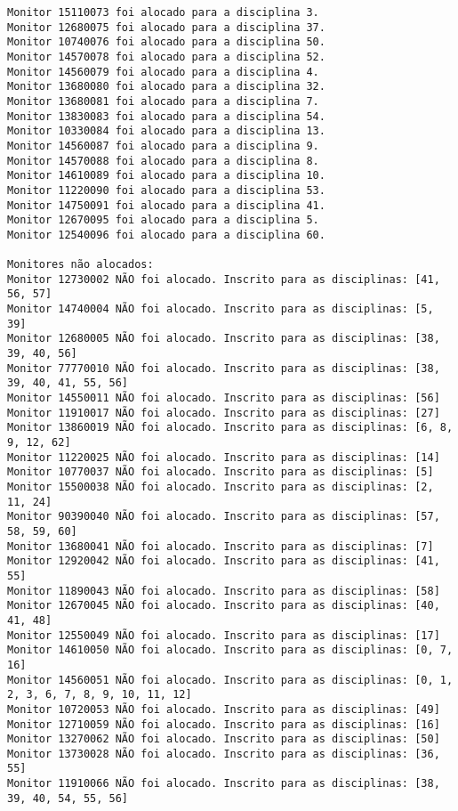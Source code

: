 \documentclass[a4paper,12pt]{article}
\begin{document}
\begin{lstlisting}[breaklines=true]
Monitor 15110073 foi alocado para a disciplina 3.
Monitor 12680075 foi alocado para a disciplina 37.
Monitor 10740076 foi alocado para a disciplina 50.
Monitor 14570078 foi alocado para a disciplina 52.
Monitor 14560079 foi alocado para a disciplina 4.
Monitor 13680080 foi alocado para a disciplina 32.
Monitor 13680081 foi alocado para a disciplina 7.
Monitor 13830083 foi alocado para a disciplina 54.
Monitor 10330084 foi alocado para a disciplina 13.
Monitor 14560087 foi alocado para a disciplina 9.
Monitor 14570088 foi alocado para a disciplina 8.
Monitor 14610089 foi alocado para a disciplina 10.
Monitor 11220090 foi alocado para a disciplina 53.
Monitor 14750091 foi alocado para a disciplina 41.
Monitor 12670095 foi alocado para a disciplina 5.
Monitor 12540096 foi alocado para a disciplina 60.

Monitores não alocados:
Monitor 12730002 NÃO foi alocado. Inscrito para as disciplinas: [41, 56, 57]
Monitor 14740004 NÃO foi alocado. Inscrito para as disciplinas: [5, 39]
Monitor 12680005 NÃO foi alocado. Inscrito para as disciplinas: [38, 39, 40, 56]
Monitor 77770010 NÃO foi alocado. Inscrito para as disciplinas: [38, 39, 40, 41, 55, 56]
Monitor 14550011 NÃO foi alocado. Inscrito para as disciplinas: [56]
Monitor 11910017 NÃO foi alocado. Inscrito para as disciplinas: [27]
Monitor 13860019 NÃO foi alocado. Inscrito para as disciplinas: [6, 8, 9, 12, 62]
Monitor 11220025 NÃO foi alocado. Inscrito para as disciplinas: [14]
Monitor 10770037 NÃO foi alocado. Inscrito para as disciplinas: [5]
Monitor 15500038 NÃO foi alocado. Inscrito para as disciplinas: [2, 11, 24]
Monitor 90390040 NÃO foi alocado. Inscrito para as disciplinas: [57, 58, 59, 60]
Monitor 13680041 NÃO foi alocado. Inscrito para as disciplinas: [7]
Monitor 12920042 NÃO foi alocado. Inscrito para as disciplinas: [41, 55]
Monitor 11890043 NÃO foi alocado. Inscrito para as disciplinas: [58]
Monitor 12670045 NÃO foi alocado. Inscrito para as disciplinas: [40, 41, 48]
Monitor 12550049 NÃO foi alocado. Inscrito para as disciplinas: [17]
Monitor 14610050 NÃO foi alocado. Inscrito para as disciplinas: [0, 7, 16]
Monitor 14560051 NÃO foi alocado. Inscrito para as disciplinas: [0, 1, 2, 3, 6, 7, 8, 9, 10, 11, 12]
Monitor 10720053 NÃO foi alocado. Inscrito para as disciplinas: [49]
Monitor 12710059 NÃO foi alocado. Inscrito para as disciplinas: [16]
Monitor 13270062 NÃO foi alocado. Inscrito para as disciplinas: [50]
Monitor 13730028 NÃO foi alocado. Inscrito para as disciplinas: [36, 55]
Monitor 11910066 NÃO foi alocado. Inscrito para as disciplinas: [38, 39, 40, 54, 55, 56]

\end{lstlisting}
\end{document}
